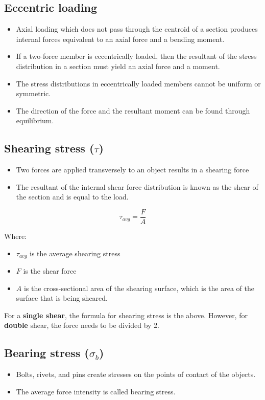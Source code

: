 \documentclass[11pt]{article}
\begin{document}
\newpage
\subsection{Eccentric loading}
\label{sec:orgaaf72a6}
\begin{itemize}
\item Axial loading which does not pass through the centroid of a section produces internal forces equivalent to an axial force and a bending moment.
\item If a two-force member is eccentrically loaded, then the resultant of the stress distribution in a section must yield an axial force and a moment.
\item The stress distributions in eccentrically loaded members cannot be uniform or symmetric.
\item The direction of the force and the resultant moment can be found through equilibrium.
\end{itemize}
\subsection{Shearing stress (\(\tau\))}
\label{sec:org2da0a05}
\begin{itemize}
\item Two forces are applied transversely to an object results in a shearing force
\item The resultant of the internal shear force distribution is known as the shear of the section and is equal to the load.
\end{itemize}

\[\tau_{avg} = \frac{F}{A}\]

Where:
\begin{itemize}
\item \(\tau_{avg}\) is the average shearing stress
\item \(F\) is the shear force
\item \(A\) is the cross-sectional area of the shearing surface, which is the area of the surface that is being sheared.
\end{itemize}

For a \textbf{single shear}, the formula for shearing stress is the above. However, for \textbf{double} shear, the force needs to be divided by 2.

\newpage
\subsection{Bearing stress (\(\sigma_b\))}
\label{sec:org5f43244}
\begin{itemize}
\item Bolts, rivets, and pins create stresses on the points of contact of the objects.
\item The average force intensity is called bearing stress.
\end{itemize}
\end{document}

